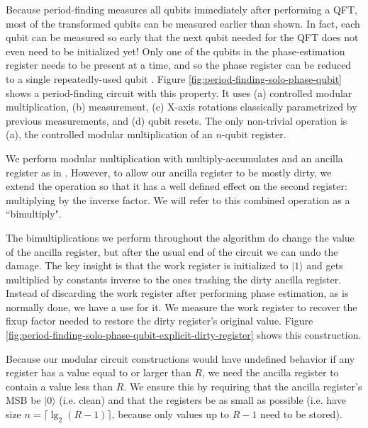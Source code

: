 \documentclass[twocolumn]{article}
\begin{document}
Because period-finding measures all qubits immediately after performing a QFT, most of the transformed qubits can be measured earlier than shown.
In fact, each qubit can be measured so early that the next qubit needed for the QFT does not even need to be initialized yet!
Only one of the qubits in the phase-estimation register needs to be present at a time, and so the phase register can be reduced to a single repeatedly-used qubit \cite{zalka1998, mosca1999, parker2000, beauregard2003}.
Figure \ref{fig:period-finding-solo-phase-qubit} shows a period-finding circuit with this property.
It uses (a) controlled modular multiplication, (b) measurement, (c) X-axis rotations classically parametrized by previous measurements, and (d) qubit resets.
The only non-trivial operation is (a), the controlled modular multiplication of an $n$-qubit register.

We perform modular multiplication with multiply-accumulates and an ancilla register as in \cite{beauregard2003}.
However, to allow our ancilla register to be mostly dirty, we extend the operation so that it has a well defined effect on the second register: multiplying by the inverse factor.
We will refer to this combined operation as a ``bimultiply".

The bimultiplications we perform throughout the algorithm do change the value of the ancilla register, but after the usual end of the circuit we can undo the damage.
The key insight is that the work register is initialized to $|1\rangle$ and gets multiplied by constants inverse to the ones trashing the dirty ancilla register.
Instead of discarding the work register after performing phase estimation, as is normally done, we have a use for it.
We measure the work register to recover the fixup factor needed to restore the dirty register's original value.
Figure \ref{fig:period-finding-solo-phase-qubit-explicit-dirty-register} shows this construction.

Because our modular circuit constructions would have undefined behavior if any register has a value equal to or larger than $R$, we need the ancilla register to contain a value less than $R$.
We ensure this by requiring that the ancilla register's MSB be $|0\rangle$ (i.e. clean) and that the registers be as small as possible (i.e. have size $n = \lceil \lg_2(R-1) \rceil$, because only values up to $R-1$ need to be stored).
\end{document}
